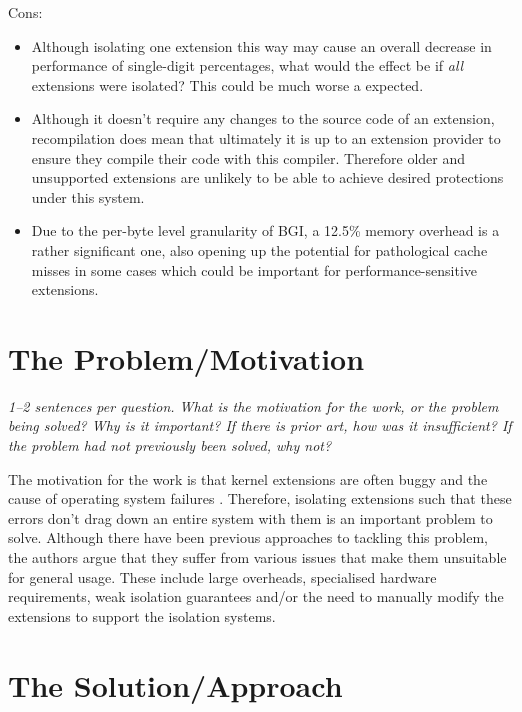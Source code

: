 \documentclass[11pt]{article}
\begin{document}
Cons:

\begin{itemize}

    \item Although isolating one extension this way may cause an overall
    decrease in performance of single-digit percentages, what would the effect
    be if \textit{all} extensions were isolated? This could be much worse a
    expected.

    \item Although it doesn't require any changes to the source code of an
    extension, recompilation does mean that ultimately it is up to an extension
    provider to ensure they compile their code with this compiler. Therefore
    older and unsupported extensions are unlikely to be able to achieve desired
    protections under this system.

    \item Due to the per-byte level granularity of BGI, a 12.5\% memory
    overhead is a rather significant one, also opening up the potential for
    pathological cache misses in some cases which could be important for
    performance-sensitive extensions.


\end{itemize}

\section*{The Problem/Motivation}

\textsl{1--2 sentences per question. What is the motivation for the work, or
the problem being solved? Why is it important? If there is prior art, how was
it insufficient? If the problem had not previously been solved, why not?}

The motivation for the work is that kernel extensions are often buggy and the
cause of operating system failures \cite{OSErrors}. Therefore, isolating
extensions such that these errors don't drag down an entire system with them is
an important problem to solve. Although there have been previous approaches to
tackling this problem, the authors argue that they suffer from various issues
that make them unsuitable for general usage. These include large overheads,
specialised hardware requirements, weak isolation guarantees and/or the need to
manually modify the extensions to support the isolation systems.

\section*{The Solution/Approach}
\end{document}
